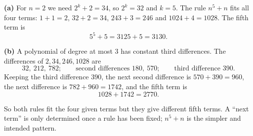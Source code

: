 \textbf{(a)} For $n=2$ we need $2^k+2=34$, so $2^k=32$ and $k=5$. The rule $n^5+n$ fits all four terms: $1+1=2$, $32+2=34$, $243+3=246$ and $1024+4=1028$. The fifth term is
\[5^5+5=3125+5=\boxed{3130}.\]

\textbf{(b)} A polynomial of degree at most $3$ has constant third differences. The differences of $2,34,246,1028$ are
\[32,\ 212,\ 782;\qquad\text{second differences } 180,\ 570;\qquad\text{third difference } 390 .\]
Keeping the third difference $390$, the next second difference is $570+390=960$, the next difference is $782+960=1742$, and the fifth term is
\[1028+1742=\boxed{2770}.\]

So both rules fit the four given terms but they give different fifth terms. A ``next term'' is only determined once a rule has been fixed; $n^5+n$ is the simpler and intended pattern.
